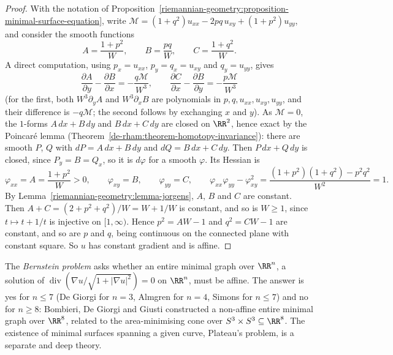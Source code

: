 \begin{proof}
With the notation of Proposition~\ref{riemannian-geometry:proposition-minimal-surface-equation}, write $\mathcal{M} = (1 + q^2)u_{xx} - 2pq\,u_{xy} + (1 + p^2)u_{yy}$, and
consider the smooth functions
\[
A = \frac{1 + p^2}{W}, \qquad B = \frac{pq}{W}, \qquad C = \frac{1 + q^2}{W}.
\]
A direct computation, using $p_x = u_{xx}$, $p_y = q_x = u_{xy}$ and $q_y = u_{yy}$, gives
\[
\frac{\partial A}{\partial y} - \frac{\partial B}{\partial x} = -\frac{q\mathcal{M}}{W^3}, \qquad \frac{\partial C}{\partial x} - \frac{\partial B}{\partial y} = -\frac{p\mathcal{M}}{W^3}
\]
(for the first, both $W^3\partial_yA$ and $W^3\partial_xB$ are polynomials in $p, q, u_{xx}, u_{xy}, u_{yy}$, and their difference is $-q\mathcal{M}$; the second follows by
exchanging $x$ and $y$). As $\mathcal{M} = 0$, the $1$-forms $A\,dx + B\,dy$ and $B\,dx + C\,dy$ are closed on $\RR^2$, hence exact by the Poincar\'e lemma
(Theorem~\ref{de-rham:theorem-homotopy-invariance}): there are smooth $P$, $Q$ with $dP = A\,dx + B\,dy$ and $dQ = B\,dx + C\,dy$. Then $P\,dx + Q\,dy$ is closed, since
$P_y = B = Q_x$, so it is $d\varphi$ for a smooth $\varphi$. Its Hessian is
\[
\varphi_{xx} = A = \frac{1 + p^2}{W} > 0, \qquad \varphi_{xy} = B, \qquad \varphi_{yy} = C, \qquad \varphi_{xx}\varphi_{yy} - \varphi_{xy}^2 = \frac{(1 + p^2)(1 + q^2) - p^2q^2}{W^2} = 1 .
\]
By Lemma~\ref{riemannian-geometry:lemma-jorgens}, $A$, $B$ and $C$ are constant. Then $A + C = (2 + p^2 + q^2)/W = W + 1/W$ is constant, and so is $W \geq 1$, since
$t \mapsto t + 1/t$ is injective on $[1, \infty)$. Hence $p^2 = AW - 1$ and $q^2 = CW - 1$ are constant, and so are $p$ and $q$, being continuous on the connected plane with
constant square. So $u$ has constant gradient and is affine.
\end{proof}

\begin{remark}\label{riemannian-geometry:remark-bernstein-problem}
The \emph{Bernstein problem} asks whether an entire minimal graph over $\RR^n$, a solution of $\operatorname{div}(\nabla u/\sqrt{1 + |\nabla u|^2}) = 0$ on $\RR^n$, must be
affine. The answer is yes for $n \leq 7$ (De Giorgi for $n = 3$, Almgren for $n = 4$, Simons \cite{simons-1968} for $n \leq 7$) and no for $n \geq 8$: Bombieri, De Giorgi and
Giusti \cite{bombieri-de-giorgi-giusti-1969} constructed a non-affine entire minimal graph over $\RR^8$, related to the area-minimising cone over
$S^3 \times S^3 \subseteq \RR^8$. The existence of minimal surfaces spanning a given curve, Plateau's problem, is a separate and deep theory.
\end{remark}

